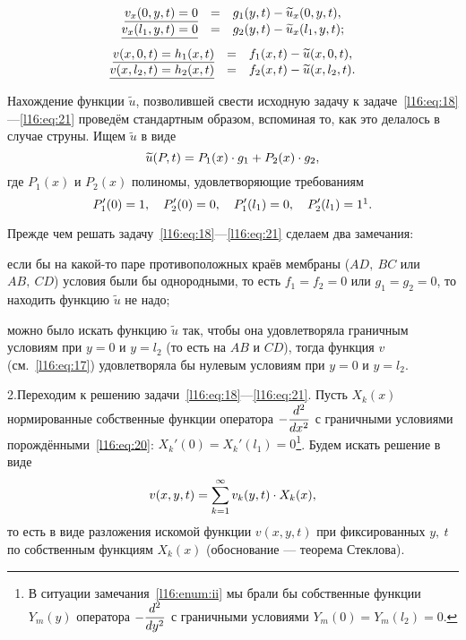 \begin{equation}\label{l16:eq:20}
	\hfill\begin{array}{rcl}
		\underline{v_x(0,y,t)=0}&=&g_1(y,t)-\widetilde{u}_x(0,y,t),\\
		\underline{v_x(l_1,y,t)=0}&=&g_2(y,t)-\widetilde{u}_x(l_1,y,t);
	\end{array} \hfill
\end{equation}
\begin{equation}\label{l16:eq:21}
	\hfill\begin{array}{rcl}
		\underline{v(x,0,t)=h_1(x,t)}&=&f_1(x,t)-\widetilde{u}(x,0,t),\\
		\underline{v(x,l_2,t)=h_2(x,t)}&=&f_2(x,t)-\widetilde{u}(x,l_2,t).
	\end{array} \hfill
\end{equation}

Нахождение функции $\widetilde{u}$, позволившей свести исходную задачу к задаче~\eqref{l16:eq:18}---\eqref{l16:eq:21} проведём стандартным образом, вспоминая то, как это делалось в случае струны. Ищем $\widetilde{u}$ в виде
\begin{equation*}
	\hfill\widetilde{u}(P,t)=P_1(x)\cdot g_1+P_2(x)\cdot g_2,\hfill
\end{equation*}
где $P_1(x)$ и $P_2(x)$ полиномы, удовлетворяющие требованиям 
\begin{equation*}
	\hfill P'_1(0)=1,\quad P'_2(0)=0,\quad P'_1(l_1)=0,\quad P'_2(l_1)=1\footnotemark{}.\hfill
\end{equation*}

Прежде чем решать задачу~\eqref{l16:eq:18}---\eqref{l16:eq:21} сделаем два замечания:
\begin{enumeraterm}
	\item если бы на какой-то паре противоположных краёв мембраны ($AD,\ BC$ или $AB,\ CD$) условия были бы однородными, то есть $f_1=f_2=0$ или $g_1=g_2=0$, то находить функцию $\widetilde{u}$ не надо;
	\item\label{l16:enum:ii} можно было искать функцию $\widetilde{u}$ так, чтобы она удовлетворяла граничным условиям при $y=0$ и $y=l_2$ (то есть на $AB$ и $CD$), тогда функция $v$ (см.~\eqref{l16:eq:17}) удовлетворяла бы нулевым условиям при $y=0$ и $y=l_2$.
\end{enumeraterm}
2.\quad Переходим к решению задачи~\eqref{l16:eq:18}---\eqref{l16:eq:21}. Пусть $X_k(x)$ нормированные собственные функции оператора $\displaystyle-\frac{d^2}{dx^2}$ с граничными условиями порождёнными~\eqref{l16:eq:20}: $X_k'(0)=X_k'(l_1)=0$\footnote{В ситуации замечания~\ref{l16:enum:ii} мы брали бы собственные функции $Y_m(y)$ оператора $-\displaystyle\frac{d^2}{dy^2}$ с граничными условиями $Y_m(0)=Y_m(l_2)=0$.}. Будем искать решение в виде 
\begin{equation}\label{l16:eq:22}
	\hfill v(x,y,t)=\sum\limits_{k=1}^{\infty}v_k(y,t)\cdot X_k(x),\hfill
\end{equation}
то есть в виде разложения искомой функции $v(x,y,t)$ при фиксированных $y,\ t$ по собственным функциям $X_k(x)$ (обоснование --- теорема Стеклова).

